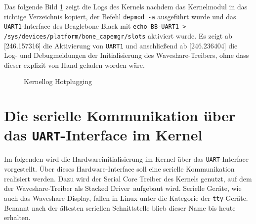 Das folgende Bild \ref{pic:hotplugging} zeigt die Logs des Kernels nachdem das Kernelmodul in das richtige Verzeichnis kopiert, der Befehl \texttt{depmod -a} ausgeführt wurde und das \texttt{UART1}-Interface des Beaglebone Black mit \texttt{echo BB-UART1 > /sys/devices/platform/bone\_capemgr/slots} aktiviert wurde. Es zeigt ab [246.157316] die Aktivierung von \texttt{UART1} und anschließend ab [246.236404] die Log- und Debugmeldungen der Initialisierung des Waveshare-Treibers, ohne dass dieser explizit von Hand geladen worden wäre.


\begin{figure}[H]
  \centering
  \caption{Kernellog Hotplugging}
  \label{pic:hotplugging}
\end{figure}


\section{Die serielle Kommunikation über das \texttt{UART}-Interface im Kernel} %
Im folgenden wird die Hardwareinitialisierung im Kernel über das \texttt{UART}-Interface vorgestellt. Über dieses Hardware-Interface soll eine serielle Kommunikation realisiert werden. Dazu wird der Serial Core Treiber des Kernels genutzt, auf dem der Waveshare-Treiber als \glqq Stacked Driver\grqq~aufgebaut wird. Serielle Geräte, wie auch das Waveshare-Display, fallen in Linux unter die Kategorie der \texttt{tty}-Geräte. Benannt nach der ältesten seriellen Schnittstelle blieb dieser Name bis heute erhalten. \\  

